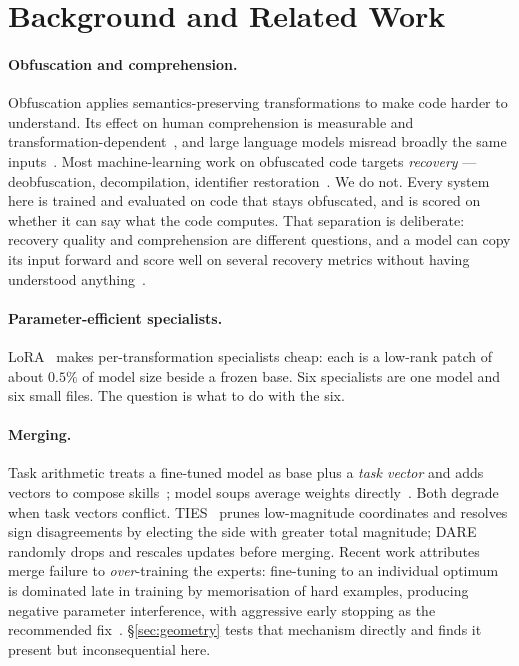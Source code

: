 \documentclass[sigconf,review,anonymous]{acmart}
\begin{document}
\section{Background and Related Work}
\label{sec:related}

\paragraph{Obfuscation and comprehension.} Obfuscation applies semantics-preserving
transformations to make code harder to understand. Its effect on human comprehension is
measurable and transformation-dependent~\cite{nguyen2026obfuscation}, and large language models
misread broadly the same inputs~\cite{le2026machines}. Most machine-learning work on obfuscated
code targets \emph{recovery} --- deobfuscation, decompilation, identifier
restoration~\cite{roziere2021dobf,tan2024llm4decompile,nikiema2025contrastive}. We do not. Every
system here is trained and evaluated on code that stays obfuscated, and is scored on whether it
can say what the code computes. That separation is deliberate: recovery quality and
comprehension are different questions, and a model can copy its input forward and score well on
several recovery metrics without having understood anything~\cite{nikiema2025contrastive}.

\paragraph{Parameter-efficient specialists.} LoRA~\cite{hu2022lora} makes per-transformation
specialists cheap: each is a low-rank patch of about $0.5\%$ of model size beside a frozen base.
Six specialists are one model and six small files. The question is what to do with the six.

\paragraph{Merging.} Task arithmetic treats a fine-tuned model as base plus a \emph{task
vector} and adds vectors to compose skills~\cite{ilharco2023task}; model soups average weights
directly~\cite{wortsman2022soups}. Both degrade when task vectors conflict.
TIES~\cite{yadav2023ties} prunes low-magnitude coordinates and resolves sign disagreements by
electing the side with greater total magnitude; DARE~\cite{yu2024dare} randomly drops and
rescales updates before merging. Recent work attributes merge failure to \emph{over}-training
the experts: fine-tuning to an individual optimum is dominated late in training by memorisation
of hard examples, producing negative parameter interference, with aggressive early stopping as
the recommended fix~\cite{horoi2025less}. \S\ref{sec:geometry} tests that mechanism directly and
finds it present but inconsequential here.
\end{document}
